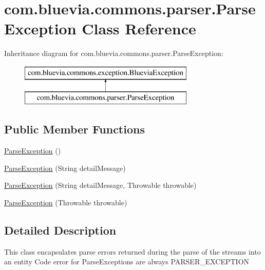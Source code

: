 \hypertarget{classcom_1_1bluevia_1_1commons_1_1parser_1_1ParseException}{
\section{com.bluevia.commons.parser.ParseException Class Reference}
\label{classcom_1_1bluevia_1_1commons_1_1parser_1_1ParseException}
}
Inheritance diagram for com.bluevia.commons.parser.ParseException:\begin{figure}[H]
\begin{center}
\leavevmode
\includegraphics[height=2.000000cm]{classcom_1_1bluevia_1_1commons_1_1parser_1_1ParseException}
\end{center}
\end{figure}
\subsection*{Public Member Functions}
\begin{DoxyCompactItemize}
\item 
\hyperlink{classcom_1_1bluevia_1_1commons_1_1parser_1_1ParseException_a8fad42798730e4d1ef648ffc3a4cf934}{ParseException} ()
\item 
\hyperlink{classcom_1_1bluevia_1_1commons_1_1parser_1_1ParseException_ac7f6fb9368e9f732e0de45351fb1e3e6}{ParseException} (String detailMessage)
\item 
\hyperlink{classcom_1_1bluevia_1_1commons_1_1parser_1_1ParseException_ab7ca22dada4ec709ed4b5637858e7442}{ParseException} (String detailMessage, Throwable throwable)
\item 
\hyperlink{classcom_1_1bluevia_1_1commons_1_1parser_1_1ParseException_af5b2eb4a32641e640019618b38a74d8f}{ParseException} (Throwable throwable)
\end{DoxyCompactItemize}


\subsection{Detailed Description}
This class encapsulates parse errors returned during the parse of the streams into an entity Code error for ParseExceptions are always PARSER\_\-EXCEPTION 

